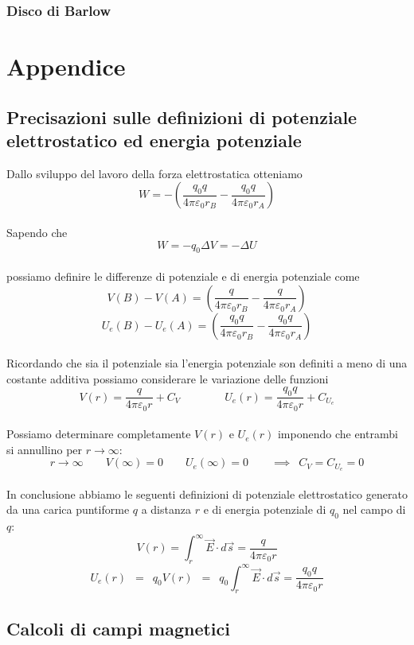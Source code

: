 \documentclass[x11names]{report}
\begin{document}
\subsection{Disco di Barlow}


\chapter{Appendice}
\section{Precisazioni sulle definizioni di potenziale elettrostatico ed energia potenziale}\label{precisazioni potenziale}
Dallo sviluppo del lavoro della forza elettrostatica otteniamo
\[
W = -\left(\frac{q_0 q}{4\pi \varepsilon_0 r_B} - \frac{q_0 q}{4\pi \varepsilon_0 r_A}\right)
\]\\
Sapendo che
\[
W = -q_0 \Delta V = -\Delta U 
\]\\
possiamo definire le differenze di potenziale e di energia potenziale come
\[
V(B) - V(A) = \left(\frac{ q}{4\pi \varepsilon_0 r_B} - \frac{q}{4\pi \varepsilon_0 r_A}\right)
\]
\[
U_e(B) - U_e(A) = \left(\frac{q_0 q}{4\pi \varepsilon_0 r_B} - \frac{q_0q}{4\pi \varepsilon_0 r_A}\right)
\]\\
Ricordando che sia il potenziale sia l'energia potenziale son definiti a meno di una costante additiva possiamo considerare le variazione delle funzioni
\[
V(r) = \frac{q}{4\pi\varepsilon_0 r} + C_V\qquad \qquad U_e(r) = \frac{q_0q}{4\pi\varepsilon_0 r} + C_{U_e}
\]\\
Possiamo determinare completamente \(V(r)\) e \(U_e(r)\) imponendo che  entrambi si annullino per \(r\to\infty\):
\[
r\to \infty \qquad V(\infty) = 0 \qquad U_e(\infty) = 0 \qquad \implies \;\ C_V = C_{U_e} = 0
\]\\
In conclusione abbiamo le seguenti definizioni di potenziale elettrostatico generato da una carica puntiforme \(q\) a distanza \(r\) e di energia potenziale di \(q_0\) nel campo di \(q\):
\[
V(r) = \int_{r}^{\infty} \vec{E}\cdot d\vec{s} = \frac{q}{4\pi\varepsilon_0 r}
\]
\[
U_e(r) \;\ = \;\ q_0V(r) \;\ = \;\ q_0\int_{r}^{\infty} \vec{E}\cdot d\vec{s} = \frac{q_0q}{4\pi\varepsilon_0 r}
\]

\section{Calcoli di campi magnetici}
\end{document}
